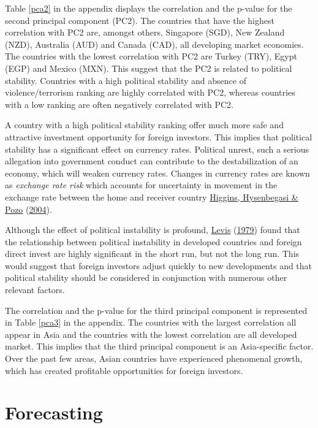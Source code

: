 \documentclass[11pt,preprint, authoryear]{elsarticle}
\numberwithin{equation}{section}
\numberwithin{figure}{section}
\numberwithin{table}{section}
\begin{document}
Table \ref{pca2} in the appendix displays the correlation and the
p-value for the second principal component (PC2). The countries that
have the highest correlation with PC2 are, amongst others, Singapore
(SGD), New Zealand (NZD), Australia (AUD) and Canada (CAD), all
developing market economies. The countries with the lowest correlation
with PC2 are Turkey (TRY), Egypt (EGP) and Mexico (MXN). This suggest
that the PC2 is related to political stability. Countries with a high
political stability and absence of violence/terrorism ranking are highly
correlated with PC2, whereas countries with a low ranking are often
negatively correlated with PC2.

A country with a high political stability ranking offer much more safe
and attractive investment opportunity for foreign investors. This
implies that political stability has a significant effect on currency
rates. Political unrest, such a serious allegation into government
conduct can contribute to the destabilization of an economy, which will
weaken currency rates. Changes in currency rates are known as
\emph{exchange rate risk} which accounts for uncertainty in movement in
the exchange rate between the home and receiver country
\protect\hyperlink{ref-higg}{Higgins, Hysenbegasi \& Pozo}
(\protect\hyperlink{ref-higg}{2004}).

Although the effect of political instability is profound,
\protect\hyperlink{ref-levis}{Levis}
(\protect\hyperlink{ref-levis}{1979}) found that the relationship
between political instability in developed countries and foreign direct
invest are highly significant in the short run, but not the long run.
This would suggest that foreign investors adjust quickly to new
developments and that political stability should be considered in
conjunction with numerous other relevant factors.

The correlation and the p-value for the third principal component is
represented in Table \ref{pca3} in the appendix. The countries with the
largest correlation all appear in Asia and the countries with the lowest
correlation are all developed market. This implies that the third
principal component is an Asia-specific factor. Over the past few areas,
Asian countries have experienced phenomenal growth, which has created
profitable opportunities for foreign investors.

\hypertarget{forecasting}{%
\section{Forecasting}\label{forecasting}}
\end{document}
